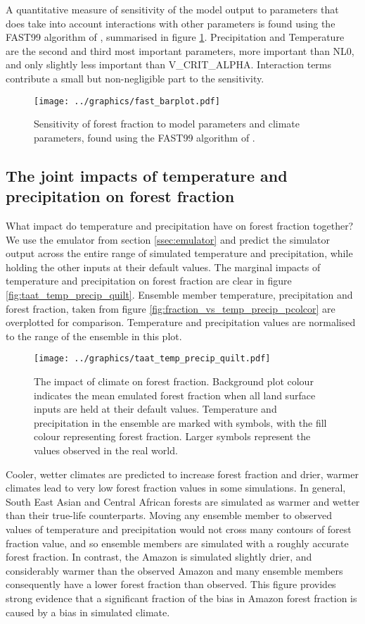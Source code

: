 \documentclass[gmd, manuscript]{copernicus}
\begin{document}
A quantitative measure of sensitivity of the model output to parameters that does take into account interactions with other parameters is found using the FAST99 algorithm of \cite{saltelli1999sensitivity}, summarised in figure \ref{fig:fast_barplot}. Precipitation and Temperature are the second and third most important parameters, more important than NL0, and only slightly less important than V\_CRIT\_ALPHA. Interaction terms contribute a small but non-negligible part to the sensitivity.

\begin{figure}[t]
\texttt{[image: ../graphics/fast\_barplot.pdf]}
\caption{Sensitivity of forest fraction to model parameters and climate parameters, found using the FAST99 algorithm of \cite{saltelli1999sensitivity}.
}
\label{fig:fast_barplot}
\end{figure}

\subsection{The joint impacts of temperature and precipitation on forest fraction}
What impact do temperature and precipitation have on forest fraction together? We use the emulator from section \ref{ssec:emulator} and predict the simulator output across the entire range of simulated temperature and precipitation, while holding the other inputs at their default values. The marginal impacts of temperature and precipitation on forest fraction are clear in figure \ref{fig:taat_temp_precip_quilt}. Ensemble member temperature, precipitation and forest fraction, taken from figure \ref{fig:fraction_vs_temp_precip_pcolcor} are overplotted for comparison. Temperature and precipitation values are normalised to the range of the ensemble in this plot.

\begin{figure}[t]
\texttt{[image: ../graphics/taat\_temp\_precip\_quilt.pdf]}
\caption{The impact of climate on forest fraction. Background plot colour indicates the mean emulated forest fraction when all land surface inputs are held at their default values. Temperature and precipitation in the ensemble are marked with symbols, with the fill colour representing forest fraction. Larger symbols represent the values observed in the real world.
}
\label{fig:fig:taat_temp_precip_quilt}
\end{figure}

Cooler, wetter climates are predicted to increase forest fraction and drier, warmer climates lead to very low forest fraction values in some simulations. In general, South East Asian and Central African forests are simulated as warmer and wetter than their true-life counterparts. Moving any ensemble member to observed values of temperature and precipitation would not cross many contours of forest fraction value, and so ensemble members are simulated with a roughly accurate forest fraction. In contrast, the Amazon is simulated slightly drier, and considerably warmer than the observed Amazon and many ensemble members consequently have a lower forest fraction than observed. This figure provides strong evidence that a significant fraction of the bias in Amazon forest fraction is caused by a bias in simulated climate.
\end{document}
